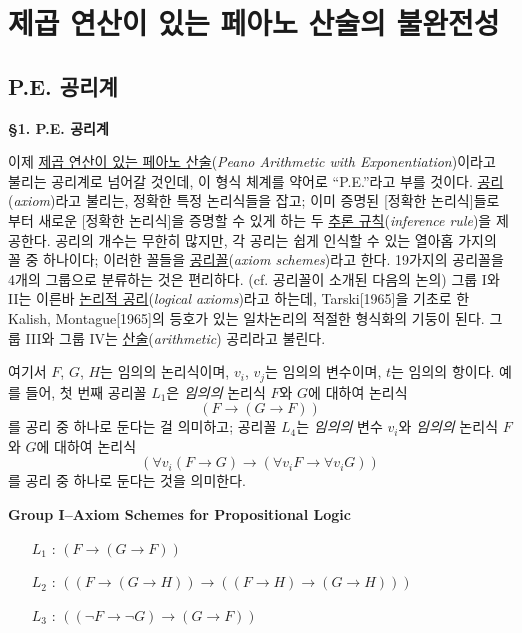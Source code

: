 \documentclass[12pt]{paper}
\begin{document}
  \newpage

  \section{제곱 연산이 있는 페아노 산술의 불완전성}
  \hspace{12pt}

  \subsection{P.E. 공리계}
  \hspace{12pt}

  \noindent \textbf{\S1. P.E. 공리계}

  이제 \underline{제곱 연산이 있는 페아노 산술}(\textit{Peano Arithmetic with Exponentiation})이라고 불리는 공리계로 넘어갈 것인데,
  이 형식 체계를 약어로 ``P.E.''라고 부를 것이다.
  \underline{공리}(\textit{axiom})라고 불리는, 정확한 특정 논리식들을 잡고;
  이미 증명된 [정확한 논리식]들로부터 새로운 [정확한 논리식]을 증명할 수 있게 하는 두 \underline{추론 규칙}(\textit{inference rule})을 제공한다.
  공리의 개수는 무한히 많지만,
  각 공리는 쉽게 인식할 수 있는 열아홉 가지의 꼴 중 하나이다;
  이러한 꼴들을 \underline{공리꼴}(\textit{axiom schemes})라고 한다.
  19가지의 공리꼴을 4개의 그룹으로 분류하는 것은 편리하다. (cf. 공리꼴이 소개된 다음의 논의)
  그룹 I와 II는 이른바 \underline{논리적 공리}(\textit{logical axioms})라고 하는데,
  Tarski[1965]을 기초로 한 Kalish, Montague[1965]의 등호가 있는 일차논리의 적절한 형식화의 기둥이 된다.
  그룹 III와 그룹 IV는 \underline{산술}(\textit{arithmetic}) 공리라고 불린다.

  여기서
  $F$, $G$, $H$는 임의의 논리식이며,
  $v_i$, $v_j$는 임의의 변수이며,
  $t$는 임의의 항이다.
  예를 들어, 첫 번째 공리꼴 $L_1$은 \textit{임의의} 논리식 $F$와 $G$에 대하여 논리식 $$\left( F \rightarrow \left( G \rightarrow F \right) \right)$$를 공리 중 하나로 둔다는 걸 의미하고;
  공리꼴 $L_4$는 \textit{임의의} 변수 $v_i$와 \textit{임의의} 논리식 $F$와 $G$에 대하여 논리식 $$\left( \forall v_i \left( F \rightarrow G \right) \rightarrow \left( \forall v_i F \rightarrow \forall v_i G \right) \right)$$를 공리 중 하나로 둔다는 것을 의미한다.

  \noindent \textbf{Group I--Axiom Schemes for Propositional Logic}
  \begin{enumerate}
    \item[$L_{1}$ :] $\left( F \rightarrow \left( G \rightarrow F \right) \right)$
    \item[$L_{2}$ :] $\left( \left( F \rightarrow \left( G \rightarrow H \right) \right) \rightarrow \left( \left( F \rightarrow H \right) \rightarrow \left( G \rightarrow H \right) \right) \right)$
    \item[$L_{3}$ :] $\left( \left( \lnot F \rightarrow \lnot G \right) \rightarrow \left( G \rightarrow F \right) \right)$
  \end{enumerate}
\end{document}
